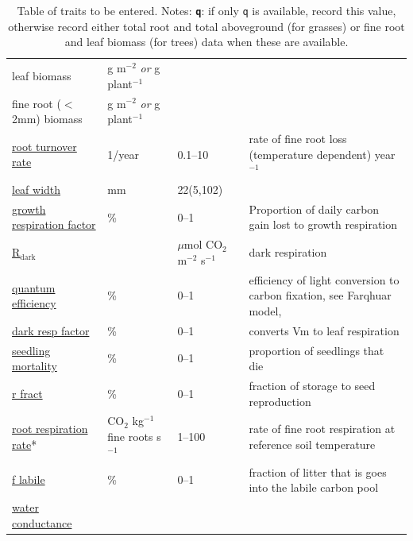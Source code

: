 \documentclass[12pt,english,portrait]{article}
\begin{document}
\begin{table}
\begin{tabular}{p{1.7in}p{1.7in}p{1.25in}p{2in}}
    \hspace{1em} leaf biomass & g m$^{-2}$  \emph{or} g plant$^{-1}$& & \\ 
    \hspace{1em} fine root ($<$2mm) biomass  & g m$^{-2}$ \emph{or} g plant$^{-1}$ & & \\
    \href{http://ebi-forecast.igb.uiuc.edu/bety/variables/41}{root turnover rate}  &1/year &0.1--10 & rate of fine root loss (temperature dependent) year$^{-1}$ \\
    \href{http://ebi-forecast.igb.uiuc.edu/bety/variables/22}{leaf width}  & mm &22(5,102) &  \\
    \href{http://ebi-forecast.igb.uiuc.edu/bety/variables/27}{growth respiration factor}  &\% & 0--1 & Proportion of daily carbon gain lost to growth respiration  \\
    \href{http://ebi-forecast.igb.uiuc.edu/bety/variables/7}{R$_{\textrm{dark}}$} & & $\mu$mol CO$_2$ m$^{-2}$ s$^{-1}$ & dark respiration\\
    \href{http://ebi-forecast.igb.uiuc.edu/bety/variables/39}{quantum efficiency} & \% & 0--1& efficiency of light conversion to carbon fixation, see Farqhuar model,  \\
    \href{http://ebi-forecast.igb.uiuc.edu/bety/variables/29}{dark resp factor}  &  \% & 0--1&converts Vm to leaf respiration \\
    \href{http://ebi-forecast.igb.uiuc.edu/bety/variables/44}{seedling mortality} &  \% & 0--1&proportion of seedlings that die \\
    \href{http://ebi-forecast.igb.uiuc.edu/bety/variables/192}{r fract}  & \% & 0--1&fraction of storage to seed reproduction \\
    \href{http://ebi-forecast.igb.uiuc.edu/bety/variables/244}{root respiration rate}{*} &CO$_2$ kg$^{-1}$ fine roots s$^{-1}$ &1--100 & rate of fine root respiration at reference soil temperature \\
    \href{http://ebi-forecast.igb.uiuc.edu/bety/variables/49}{f labile}  & \% & 0--1&fraction of litter that is goes into the labile carbon pool  \\
    \href{http://ebi-forecast.igb.uiuc.edu/bety/variables/45}{water conductance}  &  & & \\
    \hline
  \end{tabular}
  \caption[Table of traits]{Table of traits to be entered. Notes: \textbf{\texttt{q}}: if only \texttt{q} is available, record this value, otherwise record either total root and total aboveground (for grasses) or fine root and leaf biomass (for trees) data when these are available.
}
\end{table}
\end{document}
